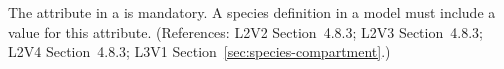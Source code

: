 The  attribute in a \Species is mandatory.  A species
definition in a model must include a value for this attribute.  (References:
L2V2 Section~4.8.3; L2V3 Section~4.8.3; L2V4 Section~4.8.3; 
L3V1 Section~\ref{sec:species-compartment}.)
